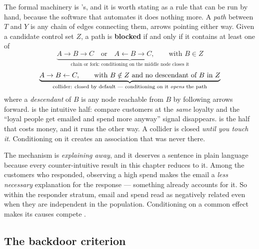 The formal machinery is \citeauthor{pearl2009}'s, and it is worth stating as a rule that can be
run by hand, because the software that automates it does nothing more. A \emph{path} between $T$
and $Y$ is any chain of edges connecting them, arrows pointing either way. Given a candidate
control set $Z$, a path is \textbf{blocked} if and only if it contains at least one of
%
\begin{equation}
  \underbrace{A \to B \to C \quad\text{or}\quad A \leftarrow B \to C,
              \qquad\text{with } B \in Z}_{\text{chain or fork: conditioning on the middle node closes it}}
  \label{eq:ctrl:dsep1}
\end{equation}
\begin{equation}
  \underbrace{A \to B \leftarrow C, \qquad\text{with } B \notin Z
              \text{ and no descendant of } B \text{ in } Z}_{%
              \text{collider: closed by default --- conditioning on it \emph{opens} the path}}
  \label{eq:ctrl:dsep2}
\end{equation}
%
where a \emph{descendant} of $B$ is any node reachable from $B$ by following arrows forward.
 is the intuitive half: compare customers at the \emph{same} loyalty and the
``loyal people get emailed and spend more anyway'' signal disappears.  is the
half that costs money, and it runs the other way. A collider is closed \emph{until you touch it}.
Conditioning on it creates an association that was never there.

The mechanism is \emph{explaining away}, and it deserves a sentence in plain language because
every counter-intuitive result in this chapter reduces to it. Among the customers who responded,
observing a high spend makes the email a \emph{less necessary} explanation for the response ---
something already accounts for it. So within the responder stratum, email and spend read as
negatively related even when they are independent in the population. Conditioning on a common
effect makes its causes compete \citep{elwert2014}.

\subsection*{The backdoor criterion}

